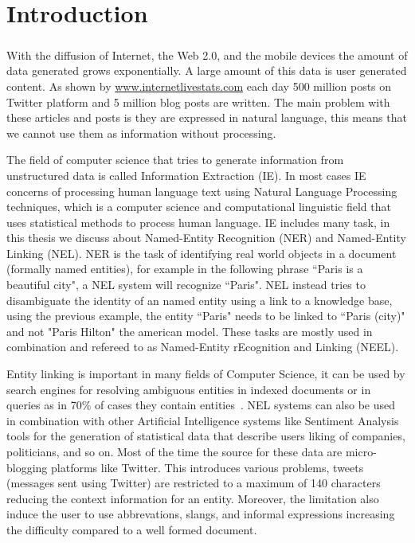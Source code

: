\chapter{Introduction}
\paragraph{}
With the diffusion of Internet, the Web 2.0, and the mobile devices the amount of data generated grows exponentially. A large amount of this data is user generated content. As shown by \href{http://www.internetlivestats.com/}{www.internetlivestats.com} each day 500 million posts on Twitter platform and 5 million blog posts are written. The main problem with these articles and posts is they are expressed in natural language, this means that we cannot use them as information without processing.

The field of computer science that tries to generate information from unstructured data is called Information Extraction (IE). In most cases IE concerns of processing human language text using Natural Language Processing techniques, which is a computer science and computational linguistic field that uses statistical methods to process human language. IE includes many task, in this thesis we discuss about Named-Entity Recognition (NER) and Named-Entity Linking (NEL). NER is the task of identifying real world objects in a document (formally named entities), for example in the following phrase ``Paris is a beautiful city", a NEL system will recognize ``Paris". NEL instead tries to disambiguate the identity of an named entity using a link to a knowledge base, using the previous example, the entity ``Paris" needs to be linked to ``Paris (city)" and not "Paris Hilton" the american model.  These tasks are mostly used in combination and refereed to as Named-Entity rEcognition and Linking (NEEL). 

Entity linking is important in many fields of Computer Science, it can be used by search engines for resolving ambiguous entities in indexed documents or in queries as in 70\% of cases they contain entities~\cite{pound2010ad}. NEL systems can also be used in combination with other Artificial Intelligence systems like Sentiment Analysis tools for the generation of statistical data that describe users liking of companies, politicians, and so on. Most of the time the source for these data are micro-blogging platforms like Twitter. This introduces various problems, tweets (messages sent using Twitter) are restricted to a maximum of 140 characters reducing the context information for an entity. Moreover, the limitation also induce the user to use abbrevations, slangs, and informal expressions increasing the difficulty compared to a well formed document.


